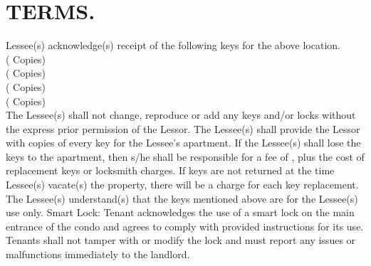 \documentclass[9pt]{article}
\renewcommand{\lostkeyfee}{32}  %
\renewcommand{\maxkeyfee}{111}  %
\renewcommand{\numkeyfront}{1}  %
\renewcommand{\numkeymailbox}{2}  %
\renewcommand{\numkeypool}{0}  %
\renewcommand{\numkeyother}{0}  %
\begin{document}

	\begin{center}
		\centering {}
	\end{center}

	\vspace{0.5cm}
	\tenantinfo{}{}

	\section{TERMS.}
	Lessee(s) acknowledge(s) receipt of the following keys for the above location.\\
	

	 (\TinyBox{\numkeyfront} Copies)\\
	 (\TinyBox{\numkeymailbox} Copies)\\
	 (\TinyBox{\numkeypool} Copies)\\
	 (\TinyBox{\numkeyother} Copies)\\

	The Lessee(s) shall not change, reproduce or add any keys and/or locks without the express prior permission of the Lessor. The Lessee(s) shall provide the Lessor with copies of every key for the Lessee’s apartment.	If the Lessee(s) shall lose the keys to the apartment, then s/he shall be responsible for a fee of \DateBox{\$\lostkeyfee}, plus the cost of replacement keys or locksmith charges. If keys are not returned at the time Lessee(s) vacate(s) the property, there will be a \DateBox{\$\maxkeyfee} charge for each key replacement. The Lessee(s) understand(s) that the keys mentioned above are for the Lessee(s) use only. Smart Lock: Tenant acknowledges the use of a smart lock on the main entrance of the condo and agrees to comply with provided instructions for its use. Tenants shall not tamper with or modify the lock and must report any issues or malfunctions immediately to the landlord.


	
\end{document}
